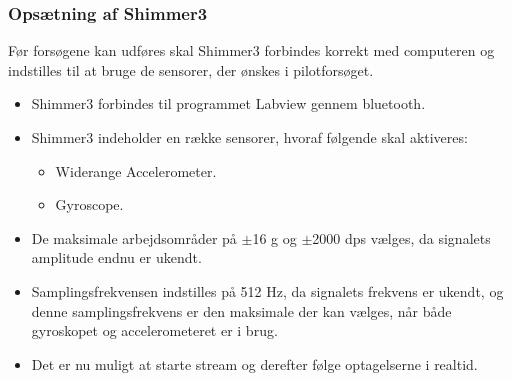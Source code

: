 \subsubsection{Opsætning af Shimmer3}
Før forsøgene kan udføres skal Shimmer3 forbindes korrekt med computeren og indstilles til at bruge de sensorer, der ønskes i pilotforsøget. \vspace{-3mm}
\begin{itemize}
	\item Shimmer3 forbindes til programmet Labview gennem bluetooth.
	\item Shimmer3 indeholder en række sensorer, hvoraf følgende skal aktiveres: 
	\begin{itemize}\vspace{-.15cm}
		\item Widerange Accelerometer.
		\item Gyroscope.
	\end{itemize}
	\item De maksimale arbejdsområder på $\pm$16 g og $\pm$2000 dps vælges, da signalets amplitude endnu er ukendt.
	\item Samplingsfrekvensen indstilles på 512 Hz, da signalets frekvens er ukendt, og denne samplingsfrekvens er den maksimale der kan vælges, når både gyroskopet og accelerometeret er i brug.  
	\item Det er nu muligt at starte stream og derefter følge optagelserne i realtid.
\end{itemize}

